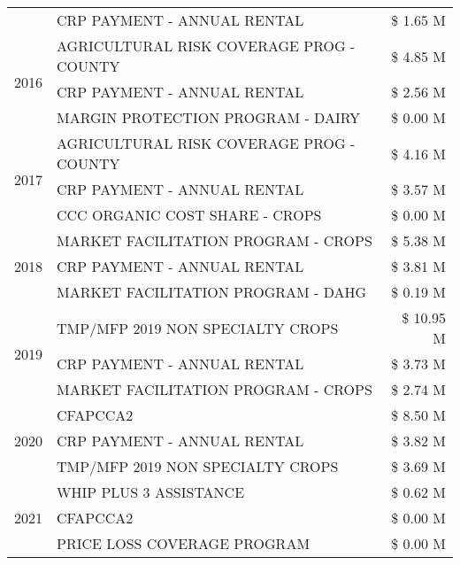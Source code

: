 \begin{tabular}{llr}
 & CRP PAYMENT - ANNUAL RENTAL & \$ 1.65 M \\
\cline{1-3}
\multirow[t]{3}{*}{2016} & AGRICULTURAL RISK COVERAGE PROG - COUNTY & \$ 4.85 M \\
 & CRP PAYMENT - ANNUAL RENTAL & \$ 2.56 M \\
 & MARGIN PROTECTION PROGRAM - DAIRY & \$ 0.00 M \\
\cline{1-3}
\multirow[t]{3}{*}{2017} & AGRICULTURAL RISK COVERAGE PROG - COUNTY & \$ 4.16 M \\
 & CRP PAYMENT - ANNUAL RENTAL & \$ 3.57 M \\
 & CCC ORGANIC COST SHARE - CROPS & \$ 0.00 M \\
\cline{1-3}
\multirow[t]{3}{*}{2018} & MARKET FACILITATION PROGRAM - CROPS & \$ 5.38 M \\
 & CRP PAYMENT - ANNUAL RENTAL & \$ 3.81 M \\
 & MARKET FACILITATION PROGRAM - DAHG & \$ 0.19 M \\
\cline{1-3}
\multirow[t]{3}{*}{2019} & TMP/MFP 2019 NON SPECIALTY CROPS & \$ 10.95 M \\
 & CRP PAYMENT - ANNUAL RENTAL & \$ 3.73 M \\
 & MARKET FACILITATION PROGRAM - CROPS & \$ 2.74 M \\
\cline{1-3}
\multirow[t]{3}{*}{2020} & CFAPCCA2 & \$ 8.50 M \\
 & CRP PAYMENT - ANNUAL RENTAL & \$ 3.82 M \\
 & TMP/MFP 2019 NON SPECIALTY CROPS & \$ 3.69 M \\
\cline{1-3}
\multirow[t]{3}{*}{2021} & WHIP PLUS 3 ASSISTANCE & \$ 0.62 M \\
 & CFAPCCA2 & \$ 0.00 M \\
 & PRICE LOSS COVERAGE PROGRAM & \$ 0.00 M \\
\cline{1-3}
\bottomrule
\end{tabular}
